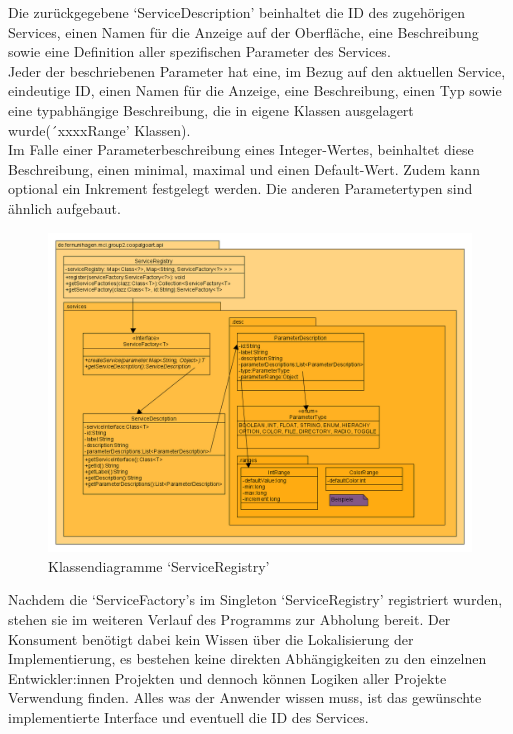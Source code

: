 \documentclass[../mciAusarbeitung.tex]{subfiles}
\begin{document}
Die zurückgegebene `ServiceDescription' beinhaltet die ID des zugehörigen Services, einen Namen für die Anzeige auf der Oberfläche, eine Beschreibung sowie eine Definition aller spezifischen Parameter des Services.\\
Jeder der beschriebenen Parameter hat eine, im Bezug auf den aktuellen Service, eindeutige ID, einen Namen für die Anzeige, eine Beschreibung, einen Typ sowie eine typabhängige Beschreibung, die in eigene Klassen ausgelagert wurde(´xxxxRange' Klassen).\\
Im Falle einer Parameterbeschreibung eines Integer-Wertes, beinhaltet diese Beschreibung, einen minimal, maximal und einen Default-Wert. Zudem kann optional ein Inkrement festgelegt werden. Die anderen Parametertypen sind ähnlich aufgebaut.\\
	\begin{figure}[H]
	 \includegraphics[width=1\linewidth]{"img/registry.png"}
	 \caption[Klassendiagramme `ServiceRegistry']{Klassendiagramme `ServiceRegistry'}
	 \end{figure}

Nachdem die `ServiceFactory's im Singleton `ServiceRegistry' registriert wurden, stehen sie im weiteren Verlauf des Programms zur Abholung bereit. Der Konsument benötigt dabei kein Wissen über die Lokalisierung der Implementierung, es bestehen keine direkten Abhängigkeiten zu den einzelnen Entwickler:innen Projekten und dennoch können Logiken aller Projekte Verwendung finden. Alles was der Anwender wissen muss, ist das gewünschte implementierte Interface und eventuell die ID des Services.\\
\end{document}
